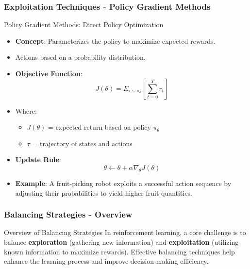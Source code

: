 \documentclass[aspectratio=169]{beamer}
\begin{document}
\begin{frame}[fragile]
    \frametitle{Exploitation Techniques - Policy Gradient Methods}
    \begin{block}{Policy Gradient Methods: Direct Policy Optimization}
        \begin{itemize}
            \item \textbf{Concept}: Parameterizes the policy to maximize expected rewards.
            \item Actions based on a probability distribution.
            \item \textbf{Objective Function}:
            \begin{equation}
            J(\theta) = E_{\tau \sim \pi_\theta} \left[ \sum_{t=0}^{T} r_t \right]
            \end{equation}
            \item Where:
            \begin{itemize}
                \item \( J(\theta) \) = expected return based on policy \( \pi_\theta \)
                \item \( \tau \) = trajectory of states and actions
            \end{itemize}
            \item \textbf{Update Rule}:
            \begin{equation}
            \theta \leftarrow \theta + \alpha \nabla_\theta J(\theta)
            \end{equation}
            \item \textbf{Example}: A fruit-picking robot exploits a successful action sequence by adjusting their probabilities to yield higher fruit quantities.
        \end{itemize}
    \end{block}
\end{frame}

\begin{frame}[fragile]
    \frametitle{Balancing Strategies - Overview}
    \begin{block}{Overview of Balancing Strategies}
        In reinforcement learning, a core challenge is to balance 
        \textbf{exploration} (gathering new information) and 
        \textbf{exploitation} (utilizing known information to maximize rewards). 
        Effective balancing techniques help enhance the learning process and 
        improve decision-making efficiency.
    \end{block}
\end{frame}
\end{document}
